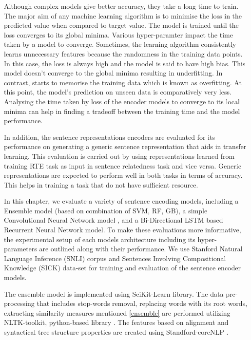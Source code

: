 \documentclass[12pt]{report} %
\begin{document}
 Although complex models give better accuracy, they take a long time to train. The major aim of any machine learning algorithm is to minimise the loss in the predicted value when compared to target value. The model is trained until the loss converges to its global minima. Various hyper-paramter impact the time taken by a model to converge. Sometimes, the learning algorithm consistently learns unnecessary features because the randomness in the training data points. In this case, the loss is always high and the model is said to have high bias. This model doesn't converge to the global minima resulting in underfitting. In contrast, starts to memorise the training data which is known as overfitting. At this point, the model's prediction on unseen data is comparatively very less.  Analysing the time taken by loss of the encoder models to converge to its local minima can help in finding a tradeoff between the training time and the model performance. 
 
 In addition, the sentence representations encoders are evaluated for its performance on generating a generic sentence representation that aids in transfer learning. This evaluation is carried out by using representations learned from training RTE task as input in sentence relatedness task and vice versa. Generic representations are expected to perform well in both tasks in terms of accuracy. This helps in training a task that do not have sufficient resource.  
 
 In this chapter, we evaluate a variety of sentence encoding models,
 including a Ensemble model (based on combination of SVM, RF, GB), a simple Convolutional Neural Network model , and a Bi-Directional LSTM based Recurrent Neural Network model. To make these evaluations more informative, the experimental setup of each models architecture including its hyper-parameters are outlined along with their performance. We use Stanford Natural Language Inference (SNLI) corpus and Sentences Involving Compositional Knowledge (SICK) data-set for training and evaluation of the sentence encoder models. 
 
  The ensemble model is implemented using SciKit-Learn library. The data pre-processing that includes stop-words removal, replacing words with its root words, extracting similarity measures mentioned \ref{ensemble} are performed utilizing NLTK-toolkit, python-based library \citep{bird2004nltk}. The features based on alignment and syntactical tree structure properties are created using Standford-coreNLP \citep{manning2014stanford}.
  
\end{document}
